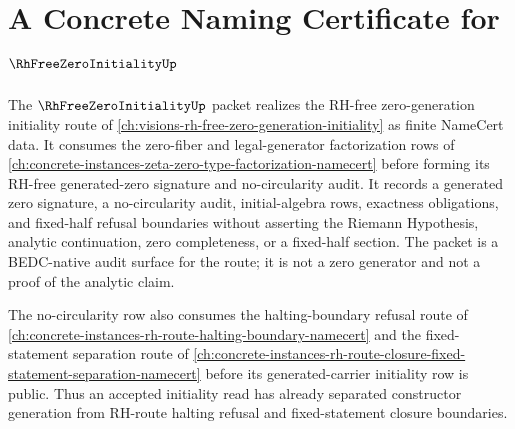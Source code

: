 \chapter{A Concrete Naming Certificate for $\RhFreeZeroInitialityUp$}
\label{ch:concrete-instances-rh-free-zero-initiality-namecert}

The $\RhFreeZeroInitialityUp$ packet realizes the RH-free zero-generation initiality route of \autoref{ch:visions-rh-free-zero-generation-initiality} as finite NameCert data. It consumes the zero-fiber and legal-generator factorization rows of \autoref{ch:concrete-instances-zeta-zero-type-factorization-namecert} before forming its RH-free generated-zero signature and no-circularity audit. It records a generated zero signature, a no-circularity audit, initial-algebra rows, exactness obligations, and fixed-half refusal boundaries without asserting the Riemann Hypothesis, analytic continuation, zero completeness, or a fixed-half section. The packet is a BEDC-native audit surface for the route; it is not a zero generator and not a proof of the analytic claim.

The no-circularity row also consumes the halting-boundary refusal route of \autoref{ch:concrete-instances-rh-route-halting-boundary-namecert} and the fixed-statement separation route of \autoref{ch:concrete-instances-rh-route-closure-fixed-statement-separation-namecert} before its generated-carrier initiality row is public. Thus an accepted initiality read has already separated constructor generation from RH-route halting refusal and fixed-statement closure boundaries.

